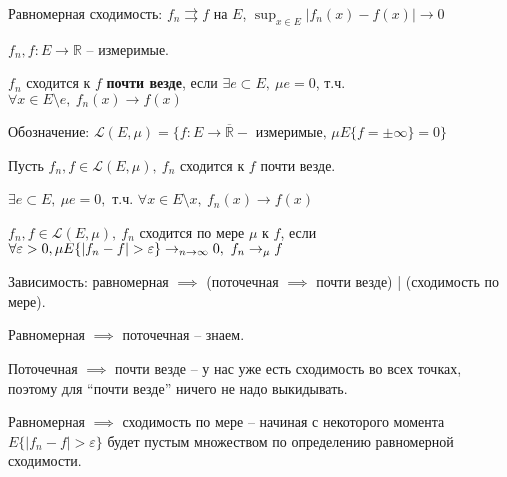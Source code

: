 Равномерная сходимость: $f_n \rightrightarrows f$ на $E$, $\sup_{x \in E} |f_n(x) - f(x)| \rightarrow 0$

\begin{definition}
    $f_n, f: E \rightarrow \mathbb{R}$ -- измеримые.

    $f_n$ сходится к $f$ \textbf{почти везде}, если $\exists e \subset E, \ \mu e = 0$, т.ч. $\forall x \in E \setminus e, \ f_n(x) \rightarrow f(x)$

    \begin{remark}
        Обозначение: $\mathcal{L}(E, \mu) = \{ f: E \rightarrow \overline{\mathbb{R}} - \text{ измеримые, } \mu E\{ f = \pm \infty\} = 0\}$
    \end{remark}

    Пусть $f_n, f \in \mathcal{L}(E, \mu), \ f_n$ сходится к $f$ почти везде.

    $\exists e \subset E, \ \mu e = 0, $ т.ч. $\forall x \in E \setminus x, \ f_n(x) \rightarrow f(x)$
\end{definition}


\begin{definition}
    $f_n, f \in \mathcal{L}(E, \mu), \ f_n$ сходится по мере $\mu$ к $f$, если $\forall \varepsilon > 0, \\ \mu E \{ | f_n - f | > \varepsilon \} \rightarrow_{n \rightarrow \infty} 0, \ f_n \rightarrow_{\mu} f$
\end{definition}

\begin{remark}
    Зависимость: равномерная $\implies$ (поточечная $\implies$ почти везде) | (сходимость по мере).

    Равномерная $\implies$ поточечная -- знаем.

    Поточечная $\implies$ почти везде -- у нас уже есть сходимость во всех точках, поэтому для ``почти везде'' ничего не надо выкидывать.

    Равномерная $\implies$ сходимость по мере -- начиная с некоторого момента $E\{|f_n - f| > \varepsilon \}$ будет пустым множеством по определению равномерной сходимости.
\end{remark}

